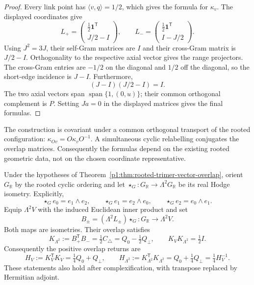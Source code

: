 \documentclass[11pt]{article}
\begin{document}
\begin{proof}
Every link point has \(\langle v,q\rangle=1/2\), which gives the
formula for \(\kappa_v\). The displayed coordinates give
\[
 L_+=\begin{pmatrix}\tfrac12\mathbf1^{\mathsf T}\\J/2-I\end{pmatrix},
 \qquad
 L_-=\begin{pmatrix}\tfrac12\mathbf1^{\mathsf T}\\I-J/2\end{pmatrix}.
\]
Using \(J^2=3J\), their self-Gram matrices are \(I\) and their
cross-Gram matrix is \(J/2-I\). Orthogonality to the respective
axial vector gives the range projectors. The cross-Gram entries
are \(-1/2\) on the diagonal and \(1/2\) off the diagonal,
so the short-edge incidence is \(J-I\). Furthermore,
\[
 (J-I)(J/2-I)=I.
\]
The two axial vectors span \(\operatorname{span}\{1,(0,u)\}\);
their common orthogonal complement is \(P\). Setting \(Ja=0\)
in the displayed matrices gives the final formulas.
\end{proof}

The construction is covariant under a common orthogonal transport of
the rooted configuration: \(\kappa_{Ov}=O\kappa_vO^{-1}\).
A simultaneous cyclic relabelling conjugates the overlap matrices.
Consequently the formulas depend on the existing rooted geometric
data, not on the chosen coordinate representative.

\begin{corollary}
\label{p1:cor:rooted-trimer-bivector-overlap}
Under the hypotheses of
Theorem~\ref{p1:thm:rooted-trimer-vector-overlap},
orient \(G_{\mathbb R}\) by the rooted cyclic ordering and let
\(\star_G:G_{\mathbb R}\to\Lambda^2G_{\mathbb R}\) be its real
Hodge isometry. Explicitly,
\[
 \star_Ge_0=e_1\wedge e_2,\qquad
 \star_Ge_1=e_2\wedge e_0,\qquad
 \star_Ge_2=e_0\wedge e_1.
\]
Equip \(\Lambda^2V\) with the induced Euclidean inner product and set
\[
 B_\pm=(\Lambda^2L_\pm)\star_G:
 G_{\mathbb R}\longrightarrow\Lambda^2V.
\]
Both maps are isometries. Their overlap satisfies
\begin{equation}
\label{p1:eq:trimer-bivector-half-incidence}
 K_{\Lambda^2}:=B_+^{\mathsf T}B_-
 =\tfrac12C_\triangle=Q_0-\tfrac12Q_\perp,
 \qquad K_VK_{\Lambda^2}=\tfrac12I.
\end{equation}
Consequently the positive overlap returns are
\begin{equation}
\label{p1:eq:trimer-reciprocal-positive-returns}
 H_V:=K_V^{\mathsf T}K_V=\tfrac14Q_0+Q_\perp,
 \qquad
 H_{\Lambda^2}:=K_{\Lambda^2}^{\mathsf T}K_{\Lambda^2}
 =Q_0+\tfrac14Q_\perp=\tfrac14H_V^{-1}.
\end{equation}
These statements also hold after complexification, with transpose
replaced by Hermitian adjoint.
\end{corollary}
\end{document}
